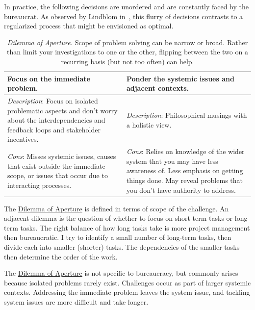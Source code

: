 In practice, the following decisions are unordered and are constantly faced by the bureaucrat. As observed by Lindblom in~\cite{1959_Lindblom}, this flurry of decisions contrasts to a regularized process that might be envisioned as optimal.


\begin{center}
\begin{table}[H] %
\begin{tabular}{ | m{\dilemmatablewidth}| m{\dilemmatablewidth} | } 
  \hline
  \textbf{Focus on the immediate problem.} &
  \textbf{Ponder the systemic issues and adjacent contexts.} \\
  \hline
  \textit{Description}: Focus on isolated problematic aspects and don't worry about the interdependencies and feedback loops and stakeholder incentives. &
  \textit{Description}: Philosophical musings with a holistic view. \\
  \hline
  \textit{Cons}: Misses systemic issues, causes that exist outside the immediate scope, or issues that occur due to interacting processes. & 
  \textit{Cons}: Relies on knowledge of the wider system that you may have less awareness of. Less emphasis on getting things done. May reveal problems that you don't have authority to address. \\
  \hline
\end{tabular}
\caption{
\textit{Dilemma of Aperture.}
Scope of problem solving can be narrow or broad. Rather than limit your investigations to one or the other, flipping between the two on a recurring basis (but not too often) can help.
}
\label{table:focus-vs-systemic}
\end{table}
\end{center}

The \hyperref[table:focus-vs-systemic]{Dilemma of Aperture} is defined in terms of scope of the challenge. An adjacent dilemma is the question of whether to focus on short-term tasks or long-term tasks. The right balance of how long tasks take is more project management then bureaucratic. I try to identify a small number of long-term tasks, then divide each into smaller (shorter) tasks. The dependencies of the smaller tasks then determine the order of the work.

The \hyperref[table:focus-vs-systemic]{Dilemma of Aperture} is not specific to bureaucracy, but commonly arises because isolated problems rarely exist. Challenges occur as part of larger systemic contexts. Addressing the immediate problem leaves the system issue, and tackling system issues are more difficult and take longer. 

